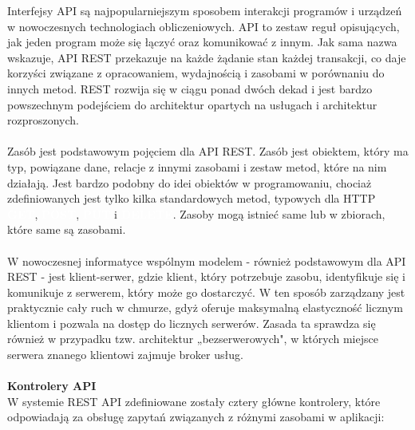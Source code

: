 \documentclass[12pt,a4paper]{article}
\begin{document}
Interfejsy API są najpopularniejszym sposobem interakcji programów i urządzeń w nowoczesnych technologiach obliczeniowych. API to zestaw reguł opisujących, jak jeden program może się łączyć oraz komunikować z innym. Jak sama nazwa wskazuje, API REST przekazuje na każde żądanie stan każdej transakcji, co daje korzyści związane z opracowaniem, wydajnością i zasobami w porównaniu do innych metod. REST rozwija się w ciągu ponad dwóch dekad i jest bardzo powszechnym podejściem do architektur opartych na usługach i architektur rozproszonych.
\\\\
Zasób jest podstawowym pojęciem dla API REST. Zasób jest obiektem, który ma typ, powiązane dane, relacje z innymi zasobami i zestaw metod, które na nim działają. Jest bardzo podobny do idei obiektów w programowaniu, chociaż zdefiniowanych jest tylko kilka standardowych metod, typowych dla HTTP \textbf{\colorbox{cyan!90}{\textcolor{white}{GET}}}, \textbf{\colorbox{green!90}{\textcolor{white}{POST}}}, \textbf{\colorbox{orange!90}{\textcolor{white}{PUT}}} i \textbf{\colorbox{red!90}{\textcolor{white}{DELETE}}}. Zasoby mogą istnieć same lub w zbiorach, które same są zasobami.
\\\\
W nowoczesnej informatyce wspólnym modelem - również podstawowym dla API REST - jest klient-serwer, gdzie klient, który potrzebuje zasobu, identyfikuje się i komunikuje z serwerem, który może go dostarczyć. W ten sposób zarządzany jest praktycznie cały ruch w chmurze, gdyż oferuje maksymalną elastyczność licznym klientom i pozwala na dostęp do licznych serwerów. Zasada ta sprawdza się również w przypadku tzw. architektur „bezserwerowych", w których miejsce serwera znanego klientowi zajmuje broker usług.
\\\\

\noindent \textbf{Kontrolery API} \\
W systemie REST API zdefiniowane zostały cztery główne kontrolery, które odpowiadają za obsługę zapytań związanych z różnymi zasobami w aplikacji:
\end{document}
